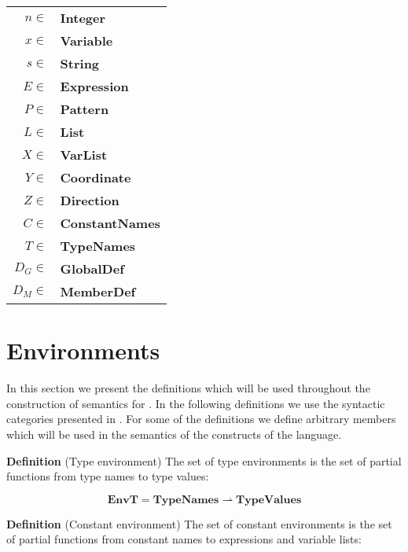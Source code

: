 \begin{table}[ht]
  \begin{center}
    \begin{tabular}{rl}
      \hline
      $n \in$ & \textbf{Integer}         \\
      $x \in$ & \textbf{Variable}        \\
      $s \in$ & \textbf{String}          \\
      $E \in$ & \textbf{Expression}      \\
      $P \in$ & \textbf{Pattern}         \\
      $L \in$ & \textbf{List}            \\
      $X \in$ & \textbf{VarList}         \\
      $Y \in$ & \textbf{Coordinate}      \\
      $Z \in$ & \textbf{Direction}       \\
      $C \in$ & \textbf{ConstantNames}   \\
      $T \in$ & \textbf{TypeNames}       \\
      $D_{G} \in$ & \textbf{GlobalDef}   \\
      $D_{M} \in$ & \textbf{MemberDef}   \\
      \hline
    \end{tabular}  
    \label{table:syn-cat}
  \end{center}
\end{table}

\chapter{Environments}
In this section we present the definitions which will be used throughout the
construction of semantics for \productname{}. In the following definitions we
use the syntactic categories presented in . For some of
the definitions we define arbitrary members which will be used in the semantics
of the constructs of the language.

\textbf{Definition} (Type environment) \hspace{0.5cm} The set of type environments is the set of
partial functions from type names to type values:

\[
  \mathbf{EnvT} = \mathbf{TypeNames} \rightharpoonup \mathbf{TypeValues}
\]

\textbf{Definition} (Constant environment) \hspace{0.5cm} The set of constant environments is the set
of partial functions from constant names to expressions and variable lists:

